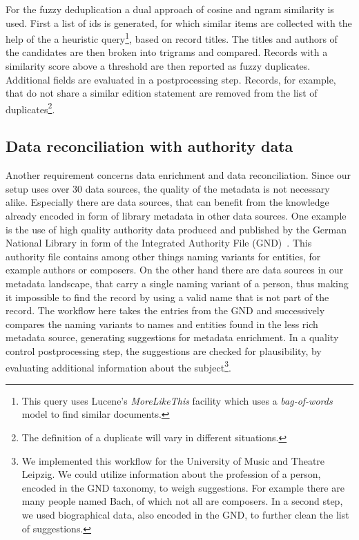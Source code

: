\documentclass[english]{lni}
\begin{document}
For the fuzzy deduplication a dual approach of cosine and ngram similarity is
used. First a list of ids is generated, for which similar items are collected
with the help of the a heuristic query\footnote{This query uses Lucene's \emph{MoreLikeThis} facility which uses a \emph{bag-of-words} model to find similar documents.}, based on record titles.
The titles and authors of the candidates are then broken into trigrams
and compared. Records with a similarity score above a threshold are then
reported as fuzzy duplicates.  Additional fields are evaluated in a postprocessing step. Records, for example,
that do not share a similar edition statement are removed from the list of
duplicates\footnote{The definition of a duplicate will vary in different situations.}.

\subsection{Data reconciliation with authority data}

Another requirement concerns data enrichment and data reconciliation.
Since our setup uses over 30 data sources, the quality of the metadata
is not necessary alike. Especially there are data sources, that can benefit from
the knowledge already encoded in form of library metadata in other
data sources. One example is the use of high quality authority data produced and
published by the German National Library in form of the Integrated Authority File (GND)~\cite{behrens2011gemeinsame}.
This authority file contains among other things naming variants for entities,
for example authors or composers. On the other hand there are data sources
in our metadata landscape, that carry a single naming variant of a person,
thus making it impossible to find the record by using a valid name that
is not part of the record. The workflow here takes the entries from the GND
and successively compares the naming variants to names and entities found in the
less rich metadata source, generating suggestions for metadata enrichment.
In a quality control postprocessing step, the suggestions are checked for plausibility, by
evaluating additional information about the subject\footnote{We implemented this workflow for the University of Music and Theatre Leipzig.
We could utilize information about the profession of a person, encoded in the GND taxonomy, to
weigh suggestions. For example there are many people named Bach, of which not all are composers. In a second step,
we used biographical data, also encoded in the GND, to further clean the list of suggestions.}.
\end{document}
